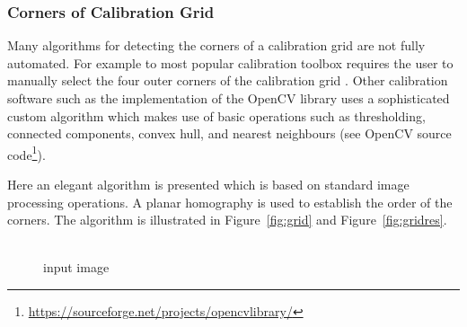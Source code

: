 \documentclass[12pt,a4paper,oneside,openright]{book}
\newcommand{\fig}[1]{Figure~\ref{fig:#1}}
\begin{document}
\begin{CJK}{UTF8}{}
\subsubsection{Corners of Calibration Grid}\label{cha:gridcorners}
Many algorithms for detecting the corners of a calibration grid are not fully automated. For example to most popular calibration toolbox requires the user to manually select the four outer corners of the calibration grid \citep{cameracalib}. Other calibration software such as the implementation of the OpenCV library uses a sophisticated custom algorithm which makes use of basic operations such as thresholding, connected components, convex hull, and nearest neighbours (see OpenCV source code\footnote{\url{https://sourceforge.net/projects/opencvlibrary/}}).

Here an elegant algorithm is presented which is based on standard image processing operations. A planar homography is used to establish the order of the corners. The algorithm is illustrated in \fig{grid} and \fig{gridres}.
\begin{figure}[htbp]
  \begin{center}
    \begin{minipage}[t]{.32\textwidth}
      \begin{center}
        \\
        input image
      \end{center}
    \end{minipage}
    \begin{minipage}[t]{.32\textwidth}
      \begin{center}

\end{center}
\end{minipage}
\end{center}
\end{figure}
\end{CJK}
\end{document}
